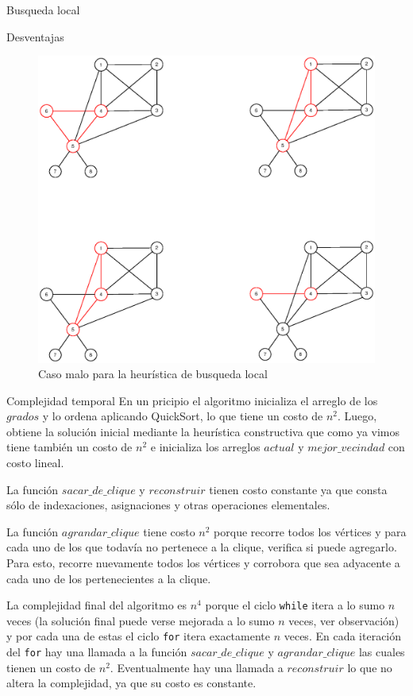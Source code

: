 \begin{section}{Busqueda local}
\begin{subsection}{Desventajas}
			\begin{figure}[H]
				\centering
		    	\includegraphics[scale=0.5]{busqueda_local/segCasoMalo2.eps}
			    \caption{Caso malo para la heurística de busqueda local}
			    \label{fig:seguimiento_caso_malo_busqueda_local2}
			\end{figure}
		\end{subsection}
		\begin{subsection}{Complejidad temporal}
			En un pricipio el algoritmo inicializa el arreglo de los $grados$ y lo ordena aplicando QuickSort, lo que tiene un costo de $n^2$. Luego, obtiene la solución inicial mediante la heurística constructiva que como ya vimos tiene también un costo de $n^2$ e inicializa los arreglos $actual$ y $mejor\_vecindad$ con costo lineal.

			La función $sacar\_de\_clique$ y $reconstruir$ tienen costo constante ya que consta sólo de indexaciones, asignaciones y otras operaciones elementales.

			La función $agrandar\_clique$ tiene costo $n^2$ porque recorre todos los vértices y para cada uno de los que todavía no pertenece a la clique, verifica si puede agregarlo. Para esto, recorre nuevamente todos los vértices y corrobora que sea adyacente a cada uno de los pertenecientes a la clique.

			La complejidad final del algoritmo es $n^4$ porque el ciclo \texttt{while} itera a lo sumo $n$ veces (la solución final puede verse mejorada a lo sumo $n$ veces, ver observación) y por cada una de estas el ciclo \texttt{for} itera exactamente $n$ veces. En cada iteración del \texttt{for} hay una llamada a la función $sacar\_de\_clique$ y $agrandar\_clique$ las cuales tienen un costo de $n^2$. Eventualmente hay una llamada a $reconstruir$ lo que no altera la complejidad, ya que su costo es constante.
			

\end{subsection}
\end{section}

